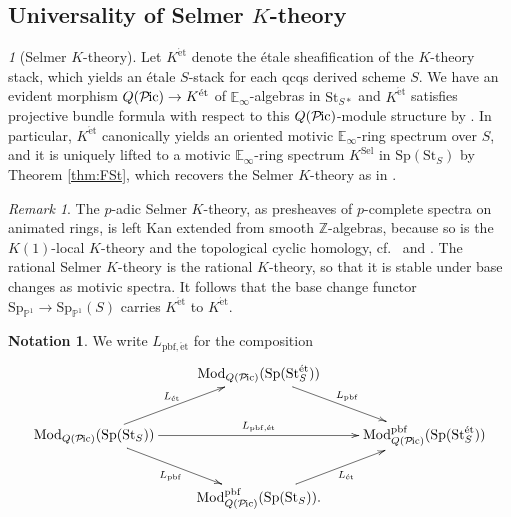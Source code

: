 \documentclass{amsart}
\theoremstyle{plain}
\theoremstyle{definition}
\newtheorem{notation}[theorem]{Notation}
\theoremstyle{remark}
\newtheorem{remark}[theorem]{Remark}
\newtheorem{p}[theorem]{}
\numberwithin{equation}{theorem}
\newcommand{\mbb}[1]{\mathbb{#1}}
\newcommand{\Mod}{\mathrm{Mod}}
\newcommand{\Sel}{\mathrm{Sel}}
\newcommand{\Sp}{\mathrm{Sp}}
\newcommand{\St}{\mathrm{St}}
\newcommand{\et}{\mathrm{\acute{e}t}}
\newcommand{\pbf}{\mathrm{pbf}}
\newcommand{\SpP}{\mathrm{Sp}_{\mathbb{P}^1}}
\newcommand{\Pic}{{\mathcal{P}\mspace{-2.0mu}\mathrm{ic}}}
\begin{document}
\subsection{Universality of Selmer $K$-theory}\label{SeK}

\begin{p}[Selmer $K$-theory]
Let $K^\et$ denote the \'etale sheafification of the $K$-theory stack, which yields an \'etale $S$-stack for each qcqs derived scheme $S$.
We have an evident morphism $Q(\Pic)\to K^\et$ of $\mbb{E}_\infty$-algebras in $\St_{S*}$ and $K^\et$ satisfies projective bundle formula with respect to this $Q(\Pic)$-module structure by \cite[Theorem 1.1]{CM}.
In particular, $K^\et$ canonically yields an oriented motivic $\mbb{E}_\infty$-ring spectrum over $S$, and it is uniquely lifted to a motivic $\mbb{E}_\infty$-ring spectrum $K^\Sel$ in $\Sp(\St_S)$ by Theorem \ref{thm:FSt}, which recovers the Selmer $K$-theory as in \cite{Cla,CM}.
\end{p}

\begin{remark}
The $p$-adic Selmer $K$-theory, as presheaves of $p$-complete spectra on animated rings, is left Kan extended from smooth $\mbb{Z}$-algebras, because so is the $K(1)$-local $K$-theory and the topological cyclic homology, cf.\ \cite[Appendix A]{EHKSY} and \cite[Theorem G]{CMM}.
The rational Selmer $K$-theory is the rational $K$-theory, so that it is stable under base changes as motivic spectra.
It follows that the base change functor $\SpP\to\SpP(S)$ carries $K^\et$ to $K^\et$.
\end{remark}

\begin{notation}
We write $L_{\pbf,\et}$ for the composition
\[
\xymatrix{
	& \Mod_{Q(\Pic)}(\Sp(\St^\et_S)) \ar[rd]^{L_\pbf} & \\
	\Mod_{Q(\Pic)}(\Sp(\St_S)) \ar[ru]^{L_\et} \ar[rd]_{L_\pbf} \ar[rr]^-{L_{\pbf,\et}} & & \Mod_{Q(\Pic)}^\pbf(\Sp(\St^\et_S)) \\
	& \Mod_{Q(\Pic)}^\pbf(\Sp(\St_S)). \ar[ru]_{L_\et} &
}
\]
\end{notation}
\end{document}
